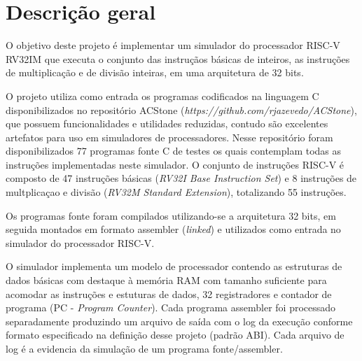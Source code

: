 
\section{Descrição geral}


O objetivo deste projeto é implementar um simulador do processador RISC-V RV32IM que executa o conjunto das instruçãos básicas de inteiros, as instruções de multiplicação e de divisão inteiras, em uma arquitetura de 32 bits.


O projeto utiliza como entrada os programas codificados na linguagem C disponibilizados no repositório ACStone (\textit{https://github.com/rjazevedo/ACStone}), que possuem funcionalidades e utilidades reduzidas, contudo são excelentes artefatos para uso em simuladores de processadores. Nesse repositório foram disponibilizados 77 programas fonte C de testes os quais contemplam todas as instruções implementadas neste simulador. O conjunto de instruções RISC-V é composto de 47 instruções básicas (\textit{RV32I Base Instruction Set}) e 8 instruções de multplicaçao e divisão (\textit{RV32M Standard Extension}), totalizando 55 instruções. 

Os programas fonte foram compilados utilizando-se a arquitetura 32 bits, em seguida montados em formato assembler (\textit{linked}) e utilizados como entrada no simulador do processador RISC-V.

O simulador implementa um modelo de processador contendo as estruturas de dados básicas com destaque à memória RAM com tamanho suficiente para acomodar as instruções e estuturas de dados, 32 registradores e contador de programa (PC - \textit{Program Counter}). Cada programa assembler foi processado separadamente produzindo um arquivo de saída com o log da execução conforme formato especificado na definição desse projeto (padrão ABI). Cada arquivo de log é a evidencia da simulação de um programa fonte/assembler.
